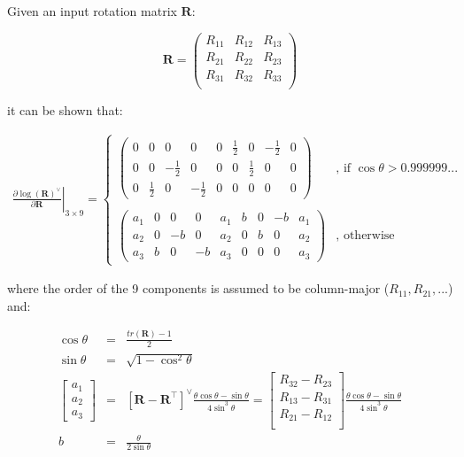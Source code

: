 \documentclass[a4paper,11pt]{report}
\begin{document}
Given an input rotation matrix $\mathbf{R}$:

\begin{equation}
\mathbf{R} = \left(
\begin{array}{ccc}
 R_{11} & R_{12} & R_{13} \\
 R_{21} & R_{22} & R_{23} \\
 R_{31} & R_{32} & R_{33} \\
\end{array}
\right)
\nonumber
\end{equation}

\noindent it can be shown that:

\begin{eqnarray}
\label{eq:dLnRot_wrt_R}
\left.
 \frac{\partial \log(\mathbf{R})^\vee }{\partial \mathbf{R}}
\right|_{3\times 9}
 =
\left\{
\begin{array}{ll}
  \left(
  \begin{array}{ccc|ccc|ccc}
   0  & 0 &  0  & 0 & 0 & \frac{1}{2} & 0 & -\frac{1}{2} & 0   \\
   0  & 0 &  -\frac{1}{2}  & 0 & 0 & 0 & \frac{1}{2} & 0 & 0   \\
   0  & \frac{1}{2} &  0 & -\frac{1}{2} & 0 & 0 & 0 & 0 & 0
  \end{array}
  \right)
 &
\text{, if $\cos\theta > 0.999999...$} \\
~\\
  \left(
  \begin{array}{ccc|ccc|ccc}
   a_1  & 0 &  0  & 0 & a_1 & b & 0 & -b & a_1   \\
   a_2  & 0 & -b  & 0 & a_2 & 0 & b & 0 & a_2   \\
   a_3  & b &  0 & -b & a_3 & 0 & 0 & 0 & a_3
  \end{array}
  \right)
 &
\text{, otherwise}
\end{array}
\right.
\end{eqnarray}

\noindent where the order of the 9 components is assumed to be column-major ($R_{11},R_{21},...$) and:

\begin{eqnarray}
\cos \theta &=& \frac{tr(\mathbf{R})-1}{2}  \nonumber \\
\sin \theta &=& \sqrt{1-\cos^2 \theta}  \nonumber \\
\left[
\begin{array}{c}
 a_1 \\ a_2 \\ a_3
\end{array}
\right]
 &=& \left[ \mathbf{R} - \mathbf{R}^\top \right]^\vee
\frac{\theta \cos\theta  -\sin \theta  }{4 \sin^3 \theta}
 = \left[
\begin{array}{c}
 R_{32} - R_{23} \\
 R_{13} - R_{31} \\
 R_{21} - R_{12} \\
\end{array}
 \right]
\frac{\theta \cos\theta  -\sin \theta  }{4 \sin^3 \theta}
\nonumber \\
b &=& \frac{\theta}{2 \sin \theta}
\nonumber
\end{eqnarray}
\end{document}
